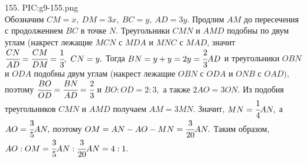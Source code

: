 155. {{PIC:g9-155.png}}\\
Обозначим $CM=x,\ DM=3x,\ BC=y,\ AD=3y.$ Продлим $AM$ до пересечения с продолжением $BC$ в точке $N.$ Треугольники $CMN$ и $AMD$ подобны по двум углам (накрест лежащие  $MCN$ с $MDA$ и $MNC$ с $MAD$, значит $\cfrac{CN}{AD}=\cfrac{CM}{DM}=\cfrac{1}{3},\ CN=y.$ Тогда $BN=y+y=2y=\cfrac{2}{3}AD$ и треугольники $OBN$ и $ODA$ подобны двум углам (накрест лежащие $OBN$ с $ODA$ и $ONB$ с $OAD),$ поэтому $\cfrac{BO}{OD}=\cfrac{BN}{AD}=\cfrac{2}{3}$ и $BO:OD=2:3,$ а также $2AO=3ON.$ Из подобия треугольников $CMN$ и $AMD$ получаем $AM=3MN.$ Значит, $MN=\cfrac{1}{4}AN,$ а $AO=\cfrac{3}{5}AN,$ поэтому $OM=AN-AO-MN=\cfrac{3}{20}AN.$ Таким образом, $AO:OM=\cfrac{3}{5}AN:\cfrac{3}{20}AN=4:1.$\\
